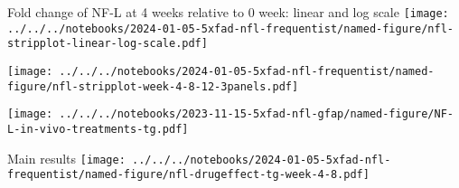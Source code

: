 \documentclass[aspectratio=169]{beamer}
\begin{document}
\begin{frame}{Fold change of NF-L at 4 weeks relative to 0 week: linear and log
  scale}
\texttt{[image: ../../../notebooks/2024-01-05-5xfad-nfl-frequentist/named-figure/nfl-stripplot-linear-log-scale.pdf]}
\end{frame}

\begin{frame}[plain]{}
\texttt{[image: ../../../notebooks/2024-01-05-5xfad-nfl-frequentist/named-figure/nfl-stripplot-week-4-8-12-3panels.pdf]}

\texttt{[image: ../../../notebooks/2023-11-15-5xfad-nfl-gfap/named-figure/NF-L-in-vivo-treatments-tg.pdf]}
\end{frame}

\begin{frame}{Main results}
\texttt{[image: ../../../notebooks/2024-01-05-5xfad-nfl-frequentist/named-figure/nfl-drugeffect-tg-week-4-8.pdf]}
\end{frame}
\end{document}
